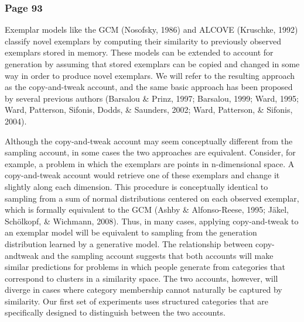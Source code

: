 \documentclass[12pt]{article}
\begin{document}
\subsubsection{Page 93}
\begin{displayquote}
Exemplar models like the GCM (Nosofsky, 1986) and ALCOVE (Kruschke, 1992) classify novel exemplars by computing their similarity to previously observed exemplars stored in memory. These models can be extended to account for generation by assuming that stored exemplars can be copied and changed in some way in order to produce novel exemplars. We will refer to the resulting approach as the copy-and-tweak account, and the same basic approach has been proposed by several previous authors (Barsalou \& Prinz, 1997; Barsalou, 1999; Ward, 1995; Ward, Patterson, Sifonis, Dodds, \& Saunders, 2002; Ward, Patterson, \& Sifonis, 2004). 

Although the copy-and-tweak account may seem conceptually different from the sampling account, in some cases the two approaches are equivalent. Consider, for example, a problem in which the exemplars are points in n-dimensional space. A copy-and-tweak account would retrieve one of these exemplars and change it slightly along each dimension. This procedure is conceptually identical to sampling from a sum of normal distributions centered on each observed exemplar, which is formally equivalent to the GCM (Ashby \& Alfonso-Reese, 1995; Jäkel, Schölkopf, \& Wichmann, 2008). Thus, in many cases, applying copy-and-tweak to an exemplar model will be equivalent to sampling from the generation distribution learned by a generative model. The relationship between copy-andtweak and the sampling account suggests that both accounts will make similar predictions for problems in which people generate from categories that correspond to clusters in a similarity space. The two accounts, however, will diverge in cases where category membership cannot naturally be captured by similarity. Our first set of experiments uses structured categories that are specifically designed to distinguish between the two accounts.
\end{displayquote}
\end{document}
